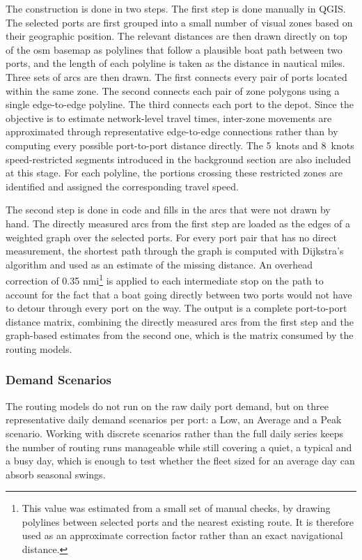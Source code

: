\documentclass[12pt]{article}
\begin{document}
The construction is done in two steps. The first step is done manually in QGIS. The selected ports are first grouped into a small number of visual zones based on their geographic position. The relevant distances are then drawn directly on top of the \ac{osm} basemap as polylines that follow a plausible boat path between two ports, and the length of each polyline is taken as the distance in nautical miles. Three sets of arcs are then drawn. The first connects every pair of ports located within the same zone. The second connects each pair of zone polygons using a single edge-to-edge polyline. The third connects each port to the depot. Since the objective is to estimate network-level travel times, inter-zone movements are approximated through representative edge-to-edge connections rather than by computing every possible port-to-port distance directly. The \qty{5}{knots} and \qty{8}{knots} speed-restricted segments introduced in the background section are also included at this stage. For each polyline, the portions crossing these restricted zones are identified and assigned the corresponding travel speed.

The second step is done in code and fills in the arcs that were not drawn by hand. The directly measured arcs from the first step are loaded as the edges of a weighted graph over the selected ports. For every port pair that has no direct measurement, the shortest path through the graph is computed with Dijkstra's algorithm and used as an estimate of the missing distance. An overhead correction of 0.35 nmi\footnote{This value was estimated from a small set of manual checks, by drawing polylines between selected ports and the nearest existing route. It is therefore used as an approximate correction factor rather than an exact navigational distance.} is applied to each intermediate stop on the path to account for the fact that a boat going directly between two ports would not have to detour through every port on the way. The output is a complete port-to-port distance matrix, combining the directly measured arcs from the first step and the graph-based estimates from the second one, which is the matrix consumed by the routing models.

\subsubsection{Demand Scenarios}
\label{subsubsec:demand-scenarios}

The routing models do not run on the raw daily port demand, but on three representative daily demand scenarios per port: a Low, an Average and a Peak scenario. Working with discrete scenarios rather than the full daily series keeps the number of routing runs manageable while still covering a quiet, a typical and a busy day, which is enough to test whether the fleet sized for an average day can absorb seasonal swings.
\end{document}
